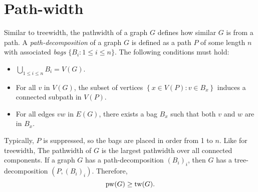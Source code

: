 \section{Path-width}\label{sec:Pathwidth}
Similar to treewidth, the pathwidth of a graph \(G\) defines how similar $G$ is from a path. A \textit{path-decomposition} of a graph \(G\) is defined as a path $P$ of some length $n$ with associated \textit{bags} \(\lbrace B_i : 1 \leq i \leq n \rbrace\). The following conditions must hold:
\begin{itemize}
	\item $\bigcup_{1 \leq i \leq n} B_i = V(G)$.
	\item For all $v$ in $V(G)$, the subset of vertices \(\left\lbrace x \in V(P): v \in B_x \right\rbrace\) induces a connected subpath in \(V(P)\).
	\item For all edges $vw$ in $E(G)$, there exists a bag \(B_x\) such that both \(v\) and \(w\) are in \(B_x\).
\end{itemize}

Typically, $P$ is suppressed, so the bags are placed in order from 1 to $n$. Like for treewidth, The pathwidth of \(G\) is the largest pathwidth over all connected components.
If a graph $G$ has a path-decomposition \({(B_i)}_i\), then $G$ has a tree-decomposition \(\left(P,{(B_i)}_i\right)\). Therefore,
\begin{equation*}
	\operatorname{pw}(G) \geq \operatorname{tw}(G).
\end{equation*}

